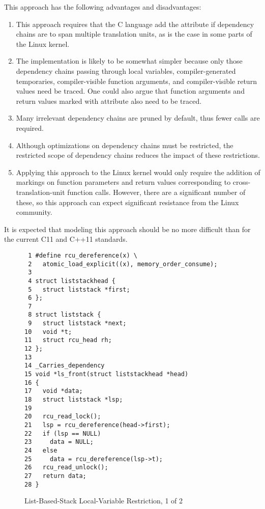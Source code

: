 \documentclass[letterpaper,twocolumn,10pt]{article}
\begin{document}
This approach has the following advantages and disadvantages:

\begin{enumerate}
\item	This approach requires that the C language add the
	 attribute if dependency chains are to
	span multiple translation units, as is the case in some parts of
	the Linux kernel.
\item	The implementation is likely to be somewhat simpler because only those
	dependency chains passing through local variables,
	compiler-generated temporaries, compiler-visible function arguments,
	and compiler-visible return values need be traced.
	One could also argue that function arguments and return values
	marked with  attribute also need to
	be traced.
\item	Many irrelevant dependency chains are pruned by default, thus
	fewer  calls are required.
\item	Although optimizations on dependency chains must be restricted,
	the restricted scope of dependency chains reduces the impact
	of these restrictions.
\item	Applying this approach to the Linux kernel would only require
	the addition of markings on function parameters and return values
	corresponding to cross-translation-unit function calls.
	However, there are a significant number of these, so this
	approach can expect significant resistance from the Linux
	community.
\end{enumerate}

It is expected that modeling this approach should be no more difficult
than for the current C11 and C++11 standards.

\begin{figure}[tbp]
{ \scriptsize
\begin{verbatim}
 1 #define rcu_dereference(x) \
 2   atomic_load_explicit((x), memory_order_consume);
 3 
 4 struct liststackhead {
 5   struct liststack *first;
 6 };
 7 
 8 struct liststack {
 9   struct liststack *next;
10   void *t;
11   struct rcu_head rh;
12 };
13 
14 _Carries_dependency
15 void *ls_front(struct liststackhead *head)
16 {
17   void *data;
18   struct liststack *lsp;
19 
20   rcu_read_lock();
21   lsp = rcu_dereference(head->first);
22   if (lsp == NULL)
23     data = NULL;
24   else
25     data = rcu_dereference(lsp->t);
26   rcu_read_unlock();
27   return data;
28 }
\end{verbatim}
}
\caption{List-Based-Stack Local-Variable Restriction, 1 of 2}
\label{fig:List-Based-Stack Local-Variable Restriction, 1 of 2}
\end{figure}
\end{document}
